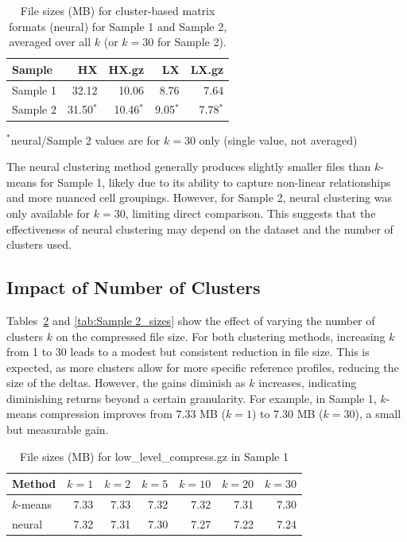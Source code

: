 \documentclass[unnumsec,webpdf,contemporary,large]{oup-authoring-template}
\begin{document}
\begin{table}[h!]
\centering
\caption{File sizes (MB) for cluster-based matrix formats (neural) for Sample 1 and Sample 2, averaged over all $k$ (or $k=30$ for Sample 2).}
\begin{tabular}{lrrrr}
\hline
Sample & HX & HX.gz & LX & LX.gz \\
\hline
Sample 1 & 32.12 & 10.06 & 8.76 & 7.64 \\
Sample 2 & 31.50$^*$ & 10.46$^*$ & 9.05$^*$ & 7.78$^*$ \\
\hline
\end{tabular}
\label{tab:neural_file_sizes_mb}
\end{table}
\begin{flushleft}
$^*$neural/Sample 2 values are for $k=30$ only (single value, not averaged)
\end{flushleft}

The neural clustering method generally produces slightly smaller files than $k$-means for Sample 1, likely due to its ability to capture non-linear relationships and more nuanced cell groupings. However, for Sample 2, neural clustering was only available for $k=30$, limiting direct comparison. This suggests that the effectiveness of neural clustering may depend on the dataset and the number of clusters used.

\subsection{Impact of Number of Clusters}
Tables~\ref{tab:Sample 1_sizes} and \ref{tab:Sample 2_sizes} show the effect of varying the number of clusters $k$ on the compressed file size. For both clustering methods, increasing $k$ from 1 to 30 leads to a modest but consistent reduction in file size. This is expected, as more clusters allow for more specific reference profiles, reducing the size of the deltas. However, the gains diminish as $k$ increases, indicating diminishing returns beyond a certain granularity. For example, in Sample 1, $k$-means compression improves from 7.33 MB ($k=1$) to 7.30 MB ($k=30$), a small but measurable gain.

\begin{table}[h!]
\centering
\caption{File sizes (MB) for low\_level\_compress.gz in Sample 1}
\begin{tabular}{lrrrrrr}
\hline
Method & $k=1$ & $k=2$ & $k=5$ & $k=10$ & $k=20$ & $k=30$ \\
\hline
$k$-means & 7.33 & 7.33 & 7.32 & 7.32 & 7.31 & 7.30 \\
neural & 7.32 & 7.31 & 7.30 & 7.27 & 7.22 & 7.24 \\
\hline
\end{tabular}
\label{tab:Sample 1_sizes}
\end{table}
\end{document}
